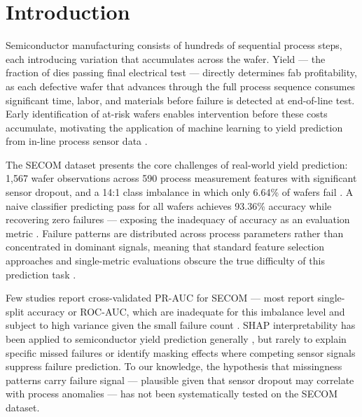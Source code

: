 \documentclass[conference]{IEEEtran}
\begin{document}
\section{Introduction}

Semiconductor manufacturing consists of hundreds of sequential 
process steps, each introducing variation that accumulates across 
the wafer. Yield --- the fraction of dies passing final electrical 
test --- directly determines fab profitability, as each defective 
wafer that advances through the full process sequence consumes 
significant time, labor, and materials before failure is detected 
at end-of-line test. Early identification of at-risk wafers enables 
intervention before these costs accumulate, motivating the 
application of machine learning to yield prediction from in-line 
process sensor data \cite{shin2000machine,huang2023survey}.

The SECOM dataset presents the core challenges of real-world yield 
prediction: 1,567 wafer observations across 590 process measurement 
features with significant sensor dropout, and a 14:1 class imbalance 
in which only 6.64\% of wafers fail \cite{dua2019uci}. A naive 
classifier predicting pass for all wafers achieves 93.36\% accuracy 
while recovering zero failures --- exposing the inadequacy of 
accuracy as an evaluation metric \cite{davis2006relationship}. 
Failure patterns are distributed across process parameters rather 
than concentrated in dominant signals, meaning that standard feature 
selection approaches and single-metric evaluations obscure the true 
difficulty of this prediction task \cite{salem2018experimental}.

Few studies report cross-validated PR-AUC for SECOM --- most report 
single-split accuracy or ROC-AUC, which are inadequate for this 
imbalance level and subject to high variance given the small failure 
count \cite{presciuttini2024advancing}. SHAP interpretability has 
been applied to semiconductor yield prediction generally 
\cite{wang2024improved}, but rarely to explain specific missed 
failures or identify masking effects where competing sensor signals 
suppress failure prediction. To our 
knowledge, the hypothesis that missingness patterns carry failure 
signal --- plausible given that sensor dropout may correlate with 
process anomalies --- has not been systematically tested on the 
SECOM dataset.
\end{document}
